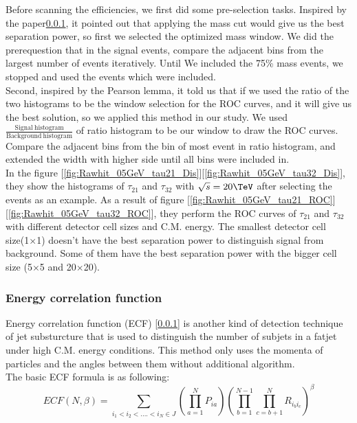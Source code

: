 \documentclass[12pt,twoside,a4paper,an,final]{cms-tdr}
\begin{document}
Before scanning the efficiencies, we first did some pre-selection tasks. Inspired by the paper\ref{}, it pointed out that applying the mass cut would give us the best separation power, so first we selected the optimized mass window.  We did the prerequestion that in the signal events, compare the adjacent bins from the largest number of events iteratively. Until We included the 75\% mass events, we stopped and used the events which were included.\\

Second, inspired by the Pearson lemma, it told us that if we used the ratio of the two histograms to be the window selection for the ROC curves, and it will give us the best solution, so we applied this method in our study. We used $\frac{\mathrm{Signal \ histogram}}{\mathrm{Background \ histogram}}$ of ratio histogram to be our window to draw the ROC curves. Compare the adjacent bins from the bin of most event in ratio histogram, and extended the width with higher side until all bins were included in.\\

In the figure [\ref{fig:Rawhit_05GeV_tau21_Dis}][\ref{fig:Rawhit_05GeV_tau32_Dis}], they show the histograms of $\tau_{21}$ and $\tau_{32}$ with $\sqrt{s} = 20\TeV$ after selecting the events as an example. As a result of figure [\ref{fig:Rawhit_05GeV_tau21_ROC}][\ref{fig:Rawhit_05GeV_tau32_ROC}], they perform the ROC curves of $\tau_{21}$ and $\tau_{32}$ with different detector cell sizes and C.M. energy. The smallest detector cell size(1$\times$1) doesn't have the best separation power to distinguish signal from background. Some of them have the best separation power with the bigger cell size (5$\times$5 and 20$\times$20).\\

\subsubsection{Energy correlation function}
Energy correlation function (ECF) [\ref{}] is another kind of detection technique of jet substurcture that is used to distinguish the number of subjets in a fatjet under high C.M. energy conditions. This method only uses the momenta of particles and the angles between them without additional algorithm.\\
The basic ECF formula is as following:\\
\begin{equation} \label{eq:ECF_Original}
ECF(N,\beta)=\sum_{i_{1}<i_{2}<....<i_{N}\in J} (\prod_{a=1}^{N}P_{ia})(\prod_{b=1}^{N-1}\prod_{c=b+1}^{N} R_{i_{b}i_{c}})^{\beta}
\end{equation}
\end{document}
